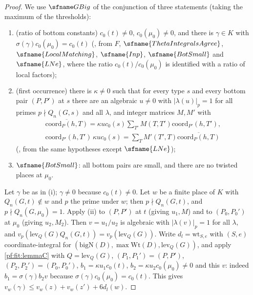\begin{proof}
We use $\fitGBig$ of the conjunction of three statements (taking the maximum of the thresholds):
\begin{enumerate}[label=(\roman*)]
\item (ratio of bottom constants) $c_0(t)\ne0$, $c_0(\mu_0)\ne0$, and there is $\gamma\in K$ with $\sigma(\gamma)c_0(\mu_0)=c_0(t)$
(, from $F$, $\sfname{ThetaIntegralsAgree}$,
$\sfname{LocalMatching}$, $\sfname{Inp}$, $\sfname{BotSmall}$ and $\sfname{LNe}$, where the ratio $c_0(t)/c_0(\mu_0)$ is
identified with a ratio of local factors);
\item (first occurrence) there is $\kappa\ne0$ such that for every type $s$ and every bottom pair $(P,P')$ at $s$ there are an
algebraic $u\ne0$ with $|\lambda(u)|_p=1$ for all primes $p\nmid Q_n(G,s)$ and all $\lambda$, and integer matrices $M,M'$ with
\begin{gather*}
\overline{\mathrm{coord}_P(h,T)}=\kappa uc_0(s)\sum_{T'}M(T,T')\mathrm{coord}_{P'}(h,T'),\\
\mathrm{coord}_{P'}(h,T')\,\kappa uc_0(s)=\sum_TM'(T',T)\overline{\mathrm{coord}_P(h,T)}
\end{gather*}
(, from the same hypotheses except $\sfname{LNe}$);
\item $\sfname{BotSmall}$: all bottom pairs are small, and there are no twisted places at $\mu_0$.
\end{enumerate}
Let $\gamma$ be as in (i); $\gamma\ne0$ because $c_0(t)\ne0$. Let $w$ be a finite place of $K$ with $Q_n(G,t)\notin w$ and $p$
the prime under $w$; then $p\nmid Q_n(G,t)$, and $p\nmid Q_n(G,\mu_0)=1$. Apply (ii) to $(P,P')$ at $t$ (giving $u_1,M$) and to
$(P_0,P_0')$ at $\mu_0$ (giving $u_2,M_2$). Then $v=u_1/u_2$ is algebraic with $|\lambda(v)|_p=1$ for all $\lambda$, and
$v_p(\mathrm{lev}_Q(G)Q_n(G,t))=v_p(\mathrm{lev}_Q(G))$. Write $d_l=\mathrm{wt}_{S,e}$ with $(S,e)$ coordinate-integral for
$(\mathrm{bigN}(D),\max\mathrm{Wt}(D),\mathrm{lev}_Q(G))$, and apply \cref{pf:fit:lemmaC} with $Q=\mathrm{lev}_Q(G)$,
$(P_1,P_1')=(P,P')$, $(P_2,P_2')=(P_0,P_0')$, $b_1=\kappa u_1c_0(t)$, $b_2=\kappa u_2c_0(\mu_0)\ne0$ and this $v$: indeed
$b_1=\sigma(\gamma)b_2v$ because $\sigma(\gamma)c_0(\mu_0)=c_0(t)$. This gives $v_w(\gamma)\le v_w(z)+v_w(z')+6d_l(w)$.
\end{proof}


